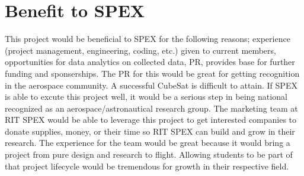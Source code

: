 \documentclass[conference]{IEEEtran} %
\begin{document}




\section{Benefit to SPEX}
\label{sec:benefit}
This project would be beneficial to SPEX for the following reasons; experience (project management, engineering, coding, etc.) given to current members, opportunities
for data analytics on collected data, PR, provides base for further funding and sponserships.
The PR for this would be great for getting recognition in the aerospace community. A successful CubeSat is
difficult to attain. If SPEX is able to excute this project well, it would be a serious step in being national recognized as an aerospace/astronautical research group.
The marketing team at RIT SPEX would be able to leverage this project to get interested companies to donate supplies, money, or their time so RIT SPEX can build
and grow in their research. The experience for the team would be great because it would bring a project from pure design and research to flight. Allowing students
to be part of that project lifecycle would be tremendous for growth in their respective field.
\end{document}
